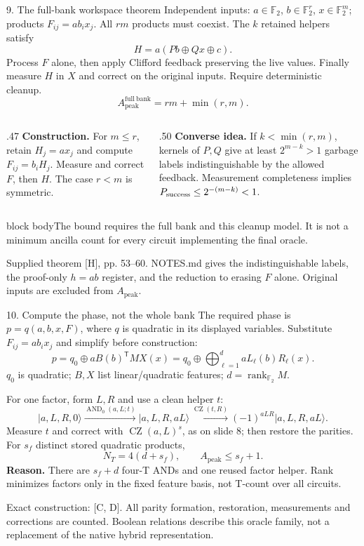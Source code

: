 \documentclass[aspectratio=169,11pt]{beamer}
\newcommand{\ket}[1]{\lvert #1\rangle}
\newcommand{\F}{\mathbb F_2}
\newcommand{\AND}{\operatorname{AND}_0}
\newcommand{\CZ}{\operatorname{CZ}}
\newcommand{\src}[1]{\par\vfill{\fontsize{6.6}{7.8}\selectfont\color{muted}#1\par}}
\newcommand{\takeaway}[1]{\par\smallskip\begin{beamercolorbox}[sep=1.4mm,wd=\linewidth]{block body}\small #1\end{beamercolorbox}}
\newcommand{\labeltext}[1]{{\color{accent}\bfseries #1}}
\begin{document}
\begin{frame}[t]{9. The full-bank workspace theorem}
\small
Independent inputs: $a\in\F$, $b\in\F^r$, $x\in\F^m$; products $F_{ij}=ab_ix_j$.
All $rm$ products must coexist. The $k$ retained helpers satisfy
\[
 H=a(Pb\oplus Qx\oplus c).
\]
Process $F$ alone, then apply Clifford feedback preserving the live values. Finally measure $H$ in $X$ and correct on the original inputs. Require deterministic cleanup.
\[
 \boxed{A_{\mathrm{peak}}^{\mathrm{full\ bank}}=rm+\min(r,m).}
\]
\begin{columns}[T,onlytextwidth]
\begin{column}{.47\textwidth}
\labeltext{Construction.} For $m\le r$, retain $H_j=ax_j$ and compute $F_{ij}=b_iH_j$. Measure and correct $F$, then $H$. The case $r<m$ is symmetric.
\end{column}
\begin{column}{.50\textwidth}
\labeltext{Converse idea.} If $k<\min(r,m)$, kernels of $P,Q$ give at least $2^{m-k}>1$ garbage labels indistinguishable by the allowed feedback. Measurement completeness implies $P_{\rm success}\le2^{-(m-k)}<1$.
\end{column}
\end{columns}
\takeaway{The bound requires the full bank and this cleanup model. It is not a minimum ancilla count for every circuit implementing the final oracle.}
\src{Supplied theorem [H], pp. 53--60. NOTES.md gives the indistinguishable labels, the proof-only $h=ab$ register, and the reduction to erasing $F$ alone. Original inputs are excluded from $A_{\mathrm{peak}}$.}
\end{frame}

\begin{frame}[t]{10. Compute the phase, not the whole bank}
\small
The required phase is $p=q(a,b,x,F)$, where $q$ is quadratic in its displayed variables. Substitute $F_{ij}=ab_ix_j$ and simplify before construction:
\[
 p=q_0\oplus aB(b)^{\mathsf T}MX(x)
   =q_0\oplus\bigoplus_{\ell=1}^{d}aL_\ell(b)R_\ell(x).
\]
$q_0$ is quadratic; $B,X$ list linear/quadratic features; $d=\operatorname{rank}_{\F}M$.

For one factor, form $L,R$ and use a clean helper $t$:
\[
 \ket{a,L,R,0}\xrightarrow{\AND(a,L;t)}\ket{a,L,R,aL}
 \xrightarrow{\CZ(t,R)}(-1)^{aLR}\ket{a,L,R,aL}.
\]
Measure $t$ and correct with $\CZ(a,L)^s$, as on slide 8; then restore the parities.
For $s_f$ distinct stored quadratic products,
\[
 \boxed{N_T=4(d+s_f),\qquad A_{\mathrm{peak}}\le s_f+1.}
\]
\labeltext{Reason.} There are $s_f+d$ four-T ANDs and one reused factor helper. Rank minimizes factors only in the fixed feature basis, not T-count over all circuits.
\src{Exact construction: [C, D]. All parity formation, restoration, measurements and corrections are counted. Boolean relations describe this oracle family, not a replacement of the native hybrid representation.}
\end{frame}
\end{document}
